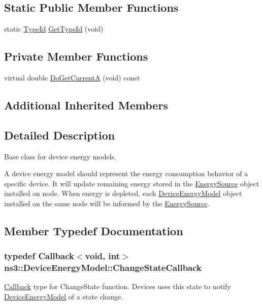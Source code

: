 \subsection*{Static Public Member Functions}
\begin{DoxyCompactItemize}
\item 
static \hyperlink{classns3_1_1TypeId}{Type\+Id} \hyperlink{classns3_1_1DeviceEnergyModel_ac1c48c8d173b81e2df60d3a55ed1cacc}{Get\+Type\+Id} (void)
\end{DoxyCompactItemize}
\subsection*{Private Member Functions}
\begin{DoxyCompactItemize}
\item 
virtual double \hyperlink{classns3_1_1DeviceEnergyModel_a08931b7e6d86de607eb38ad836509170}{Do\+Get\+CurrentA} (void) const 
\end{DoxyCompactItemize}
\subsection*{Additional Inherited Members}


\subsection{Detailed Description}
Base class for device energy models. 

A device energy model should represent the energy consumption behavior of a specific device. It will update remaining energy stored in the \hyperlink{classns3_1_1EnergySource}{Energy\+Source} object installed on node. When energy is depleted, each \hyperlink{classns3_1_1DeviceEnergyModel}{Device\+Energy\+Model} object installed on the same node will be informed by the \hyperlink{classns3_1_1EnergySource}{Energy\+Source}. 

\subsection{Member Typedef Documentation}
\subsubsection[{\texorpdfstring{Change\+State\+Callback}{ChangeStateCallback}}]{\setlength{\rightskip}{0pt plus 5cm}typedef {\bf Callback}$<$void, int$>$ {\bf ns3\+::\+Device\+Energy\+Model\+::\+Change\+State\+Callback}}\hypertarget{classns3_1_1DeviceEnergyModel_a26632ed1b86ee8f6c7fc4c756f0027ad}{}\label{classns3_1_1DeviceEnergyModel_a26632ed1b86ee8f6c7fc4c756f0027ad}
\hyperlink{classns3_1_1Callback}{Callback} type for Change\+State function. Devices uses this state to notify \hyperlink{classns3_1_1DeviceEnergyModel}{Device\+Energy\+Model} of a state change. 

